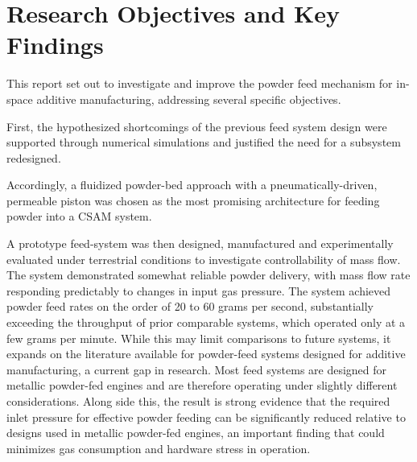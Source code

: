 





\section{Research Objectives and Key Findings}
This report set out to investigate and improve the powder feed mechanism for in-space additive manufacturing, addressing several specific objectives. 

First, the hypothesized shortcomings of the previous feed system design were supported through numerical simulations and justified the need for a subsystem redesigned. 

Accordingly, a fluidized powder-bed approach with a pneumatically-driven, permeable piston was chosen as the most promising architecture for feeding powder into a CSAM system. 

A prototype feed-system was then designed, manufactured and experimentally evaluated under terrestrial conditions to investigate controllability of mass flow. The system demonstrated somewhat reliable powder delivery, with mass flow rate responding predictably to changes in input gas pressure. The system achieved powder feed rates on the order of 20 to 60 grams per second, substantially exceeding the throughput of prior comparable systems, which operated only at a few grams per minute. While this may limit comparisons to future systems, it expands on the literature available for powder-feed systems designed for additive manufacturing, a current gap in research. Most feed systems are designed for metallic powder-fed engines and are therefore operating under slightly different considerations. Along side this, the result is strong evidence that the required inlet pressure for effective powder feeding can be significantly reduced relative to designs used in metallic powder-fed engines, an important finding that could minimizes gas consumption and hardware stress in operation. 

